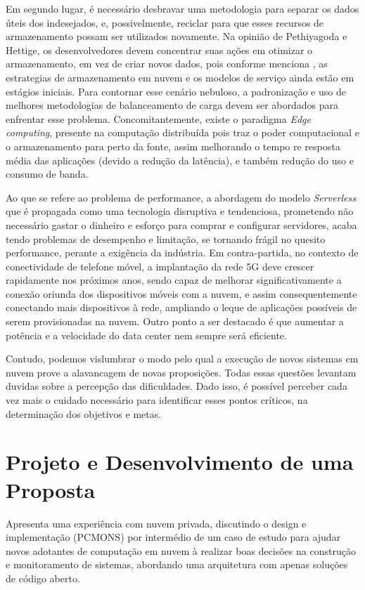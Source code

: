 \documentclass[12pt]{article}
\begin{document}
Em segundo lugar, é necessário desbravar uma metodologia para separar os dados úteis dos indesejados, e, possivelmente, reciclar para que esses recursos de armazenamento possam ser utilizados novamente. Na opinião de Pethiyagoda e Hettige, os desenvolvedores devem concentrar suas ações em otimizar o armazenamento, em vez de criar novos dados, pois conforme menciona \cite{shanthi}, as estrategias de armazenamento em nuvem e os modelos de serviço ainda estão em estágios iniciais. Para contornar esse cenário nebuloso, a padronização e uso de melhores metodologias de balanceamento de carga devem ser abordados para enfrentar esse problema. Concomitantemente, existe o paradigma \emph{Edge computing}, presente na computação distribuída pois traz o poder computacional e o armazenamento para perto da fonte, assim melhorando o tempo re resposta média das aplicações (devido a redução da latência), e também redução do uso e consumo de banda.

Ao que se refere ao problema de performance, a abordagem do modelo \emph{Serverless} que é propagada como uma tecnologia disruptiva e tendenciosa, prometendo não necessário gastar o dinheiro e esforço para comprar e configurar servidores, acaba tendo problemas de desempenho e limitação, se tornando frágil no quesito performance, perante a exigência da indústria. Em contra-partida, no contexto de conectividade de telefone móvel, a implantação da rede 5G deve crescer rapidamente nos próximos anos, sendo capaz de melhorar significativamente a conexão oriunda dos dispositivos móveis com a nuvem, e assim consequentemente conectando mais dispositivos à rede, ampliando o leque de aplicações possíveis de serem provisionadas na nuvem. Outro ponto a ser destacado é que aumentar a potência e a velocidade do data center nem sempre será eficiente.

Contudo, podemos vislumbrar o modo pelo qual a execução de novos sistemas em nuvem prove a alavancagem de novas proposições. Todas essas questões levantam duvidas sobre a percepção das dificuldades. Dado isso, é possível perceber cada vez mais o cuidado necessário para identificar esses pontos críticos, na determinação dos objetivos e metas.

\section{Projeto e Desenvolvimento de uma Proposta}
\cite{westphall} Apresenta uma experiência com nuvem privada, discutindo o design e implementação (PCMONS) por intermédio de um caso de estudo para ajudar novos adotantes de computação em nuvem à realizar boas decisões na construção e monitoramento de sistemas, abordando uma arquitetura com apenas soluções de código aberto.
\end{document}

